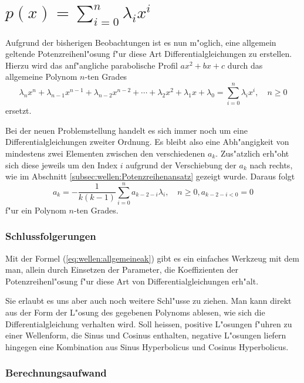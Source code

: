 \section{\texorpdfstring{$p(x) = \sum_{i=0}^{n}\lambda_ix^i$}{p(x) = summe i = 
0 bis n lambdai xi}}

Aufgrund der bisherigen Beobachtungen ist es nun m"oglich, eine 
allgemein geltende Potenzreihenl"osung f"ur diese Art Differentialgleichungen 
zu erstellen. Hierzu wird das anf"angliche parabolische Profil $ax^2 + bx + c$ 
durch das allgemeine Polynom $n$-ten Grades
\begin{equation*}
	\lambda_nx^n + \lambda_{n-1}x^{n-1} + \lambda_{n-2}x^{n-2} + \dotsb + 
	\lambda_2x^2 + \lambda_1x + \lambda_0 = \sum_{i=0}^{n}\lambda_ix^i, \quad n 
	\ge 0
\end{equation*}
ersetzt.

Bei der neuen Problemstellung handelt es sich immer noch um eine 
Differentialgleichungen zweiter Ordnung. Es bleibt also eine Abh"angigkeit von 
mindestens zwei Elementen zwischen den verschiedenen $a_k$. Zus"atzlich erh"oht 
sich diese jeweils um den Index $i$ aufgrund der Verschiebung der $a_k$ nach 
rechts, wie im Abschnitt \ref{subsec:wellen:Potenzreihenansatz} gezeigt wurde. 
Daraus folgt
\begin{equation}
	a_k = -\frac{1}{k(k-1)}\sum_{i=0}^{n}a_{k-2-i}\lambda_i, \quad n \ge 0, 
	a_{k-2-i < 0} =  0
	\label{eq:wellen:allgemeineak}
\end{equation}
f"ur ein Polynom $n$-ten Grades.

\subsubsection{Schlussfolgerungen}

Mit der Formel (\ref{eq:wellen:allgemeineak}) gibt es ein einfaches 
Werkzeug mit dem man, allein durch Einsetzen der Parameter, die Koeffizienten 
der Potenzreihenl"osung f"ur diese Art von Differentialgleichungen erh"alt.

Sie erlaubt es uns aber auch noch weitere Schl"usse zu ziehen. Man kann direkt 
aus der Form der L"osung des gegebenen Polynoms ablesen, wie sich die 
Differentialgleichung verhalten wird. Soll heissen, positive L"osungen 
f"uhren zu einer Wellenform, die Sinus und Cosinus enthalten, negative 
L"osungen liefern hingegen eine Kombination aus Sinus Hyperbolicus und Cosinus 
Hyperbolicus.

\subsubsection{Berechnungsaufwand}







